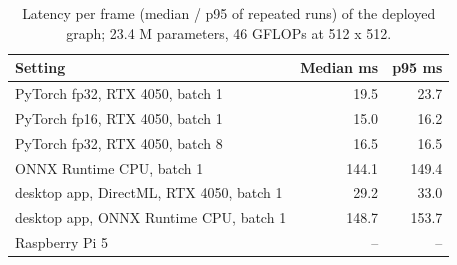 \begin{table}[t]
\centering
\footnotesize
\begin{tabular}{lrr}
\toprule
Setting & Median ms & p95 ms \\
\midrule
PyTorch fp32, RTX 4050, batch 1 & 19.5 & 23.7 \\
PyTorch fp16, RTX 4050, batch 1 & 15.0 & 16.2 \\
PyTorch fp32, RTX 4050, batch 8 & 16.5 & 16.5 \\
ONNX Runtime CPU, batch 1 & 144.1 & 149.4 \\
desktop app, DirectML, RTX 4050, batch 1 & 29.2 & 33.0 \\
desktop app, ONNX Runtime CPU, batch 1 & 148.7 & 153.7 \\
Raspberry Pi 5 & – & – \\
\bottomrule
\end{tabular}
\caption{Latency per frame (median / p95 of repeated runs) of the deployed graph; 23.4 M parameters, 46 GFLOPs at 512 x 512.}
\label{tab:efficiency}
\end{table}
